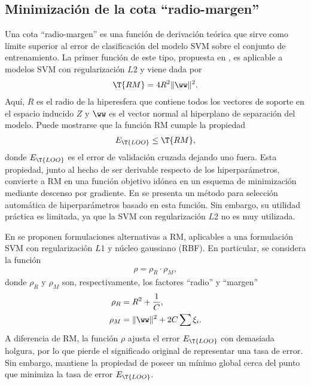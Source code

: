 %
%
\subsection{Minimización de la cota ``radio-margen''}
%
Una cota ``radio-margen'' es una función de derivación teórica
que sirve como límite superior al error de clasificación
 del modelo SVM sobre el conjunto de
entrenamiento. La primer función de este tipo, propuesta en \cite{vapnik},
es aplicable a modelos SVM con regularización $L2$ y viene dada por
\begin{align}
  \T{RM} = 4R^2 \|\ww\|^2.
\end{align}
%
Aquí, $R$ es el radio de la hiperesfera que contiene todos los
vectores de soporte en el espacio inducido $Z$ y $\ww$ es el vector
normal al hiperplano de separación del modelo.
Puede mostrarse que la función RM cumple la propiedad
%
\begin{align}
  E_{\T{LOO}} \leq \T{RM},
\end{align}
%
donde $E_{\T{LOO}}$ es el error de validación cruzada dejando uno
fuera. Esta propiedad, junto al hecho de ser derivable respecto de los
hiperparámetros, convierte a RM en una función objetivo idónea en un esquema
de minimización mediante descenso por gradiente.
En \cite{chapelle} se presenta un método para selección automática de
hiperparámetros basado en esta función.
Sin embargo, su utilidad práctica es limitada, ya que
la SVM con regularización $L2$ no es muy utilizada.

En \cite{chung} se proponen formulaciones alternativas a RM, aplicables
a una formulación SVM con regularización $L1$ y núcleo gaussiano
(RBF). En particular, se considera la función
%
\begin{align}
  \rho = \rho_R \cdot \rho_M,
\end{align}
%
donde $\rho_R$ y $\rho_M$ son, respectivamente, los factores ``radio'' y ``margen''
%
\begin{align}
  \rho_R &= R^2+\frac{1}{C}, \\
  \rho_M &= \|\ww\|^2+2C\sum\xi_i.
\end{align}
%
A diferencia de {RM}, la función $\rho$ ajusta el error $E_{\T{LOO}}$
con demasiada holgura, por lo que pierde el significado original de
representar una tasa de error. Sin embargo, mantiene la propiedad de
poseer un mínimo global cerca del punto que minimiza la tasa de error $E_{\T{LOO}}$.
